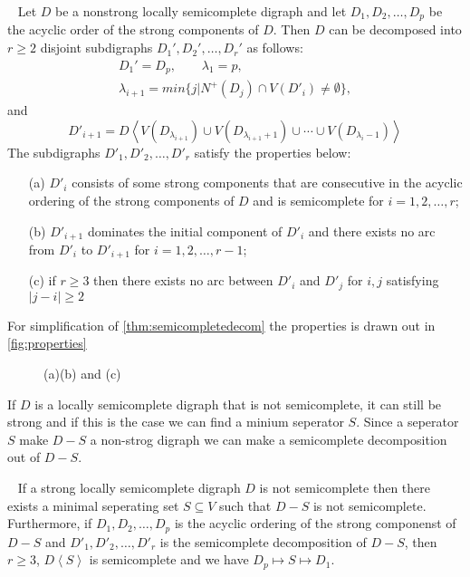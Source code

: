 \begin{thm}~\cite{bangJGT85,banggutin,bangJCT102}
    Let $D$ be a nonstrong locally semicomplete digraph and let $D_1,D_2,\dots,D_p$ be the acyclic order of the strong components of $D$. Then $D$ can be decomposed into $r\geq 2$ disjoint subdigraphs $D_1',D_2',\dots, D_r'$ as follows:
    \begin{align*}
        D_1'=D_p, \qquad \lambda_1=p,\\
        \lambda_{i+1}=min\lbrace j|N^+(D_j)\cap V(D'_i)\neq \emptyset\rbrace,
    \end{align*}
    and
    \begin{equation*}
        D'_{i+1}=D\left< V(D_{\lambda_{i+1}})\cup V(D_{\lambda_{i+1}+1})\cup \cdots \cup V(D_{\lambda_{i}-1})\right>
    \end{equation*}
    The subdigraphs $D'_1,D'_2,\dots,D'_r$ satisfy the properties below:
    \begin{itemize}
        \item[(a)] $D'_i$ consists of some strong components that are consecutive in the acyclic ordering of the strong components of $D$ and is semicomplete for $i=1,2,\dots ,r$;
        \item[(b)] $D'_{i+1}$ dominates the initial component of $D'_i$ and there exists no arc from $D'_i$ to $D'_{i+1}$ for $i=1,2,\dots ,r-1$;
        \item[(c)] if $r\geq 3$ then there exists no arc between $D'_i$ and $D'_j$ for $i,j$ satisfying $|j-i|\geq 2$  
    \end{itemize}
    \label{thm:semicompletedecom}
\end{thm}
For simplification of \autoref{thm:semicompletedecom} the properties is drawn out in \autoref{fig:properties}
\begin{figure}
    \caption{(a)(b) and (c)}
    \label{fig:properties}
\end{figure}
If $D$ is a locally semicomplete digraph that is not semicomplete, it can still be strong and if this is the case we can find a minium seperator $S$. Since a seperator $S$ make $D-S$ a non-strog digraph we can make a semicomplete decomposition out of $D-S$.
\begin{thm}~\cite{banggutin}
    If a strong locally semicomplete digraph $D$ is not semicomplete then there exists a minimal seperating set $S\subseteq V$ such that $D-S$ is not semicomplete. Furthermore, if $D_1,D_2,\dots , D_p$ is the acyclic ordering of the strong componenst of $D-S$ and $D'_1,D'_2,\dots ,D'_r$ is the semicomplete decomposition of $D-S$, then $r\geq 3$, $D\left<S\right>$ is semicomplete and we have $D_p\mapsto S\mapsto D_1$.  
\end{thm}

